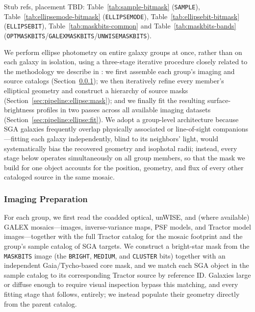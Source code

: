 \documentclass[modern,linenumbers]{aastex701}
\newcommand{\JM}[1]{{\color{blue}#1}}
\begin{document}
\JM{Stub refs, placement TBD: Table~\ref{tab:sample-bitmask} (\texttt{SAMPLE}),
Table~\ref{tab:ellipsemode-bitmask} (\texttt{ELLIPSEMODE}),
Table~\ref{tab:ellipsebit-bitmask} (\texttt{ELLIPSEBIT}),
Table~\ref{tab:maskbits-common} and Table~\ref{tab:maskbits-bands}
(\texttt{OPTMASKBITS}/\texttt{GALEXMASKBITS}/\texttt{UNWISEMASKBITS}).}





We perform ellipse photometry on entire galaxy groups at once, rather
than on each galaxy in isolation, using a three-stage iterative
procedure closely related to the methodology we describe in
\citet{moustakas23a}: we first assemble each group's imaging and source
catalogs (Section~\ref{sec:pipeline:ellipse:read}); we then iteratively
refine every member's elliptical geometry and construct a hierarchy of
source masks (Section~\ref{sec:pipeline:ellipse:mask}); and we finally
fit the resulting surface-brightness profiles in two passes across all
available imaging datasets (Section~\ref{sec:pipeline:ellipse:fit}). We
adopt a group-level architecture because SGA galaxies frequently overlap
physically associated or line-of-sight companions---fitting each galaxy
independently, blind to its neighbors' light, would systematically bias
the recovered geometry and isophotal radii; instead, every stage below
operates simultaneously on all group members, so that the mask we build
for one object accounts for the position, geometry, and flux of every
other cataloged source in the same mosaic.

\subsubsection{Imaging Preparation}
\label{sec:pipeline:ellipse:read}

For each group, we first read the coadded optical, unWISE, and (where
available) GALEX mosaics---images, inverse-variance maps, PSF models,
and Tractor model images---together with the full Tractor catalog for
the mosaic footprint and the group's sample catalog of SGA targets. We
construct a bright-star mask from the \texttt{MASKBITS} image (the
\texttt{BRIGHT}, \texttt{MEDIUM}, and \texttt{CLUSTER} bits) together
with an independent Gaia/Tycho-based core mask, and we match each SGA
object in the sample catalog to its corresponding Tractor source by
reference ID. Galaxies large or diffuse enough to require visual
inspection bypass this matching, and every fitting stage that follows,
entirely; we instead populate their geometry directly from the parent
catalog.
\end{document}

